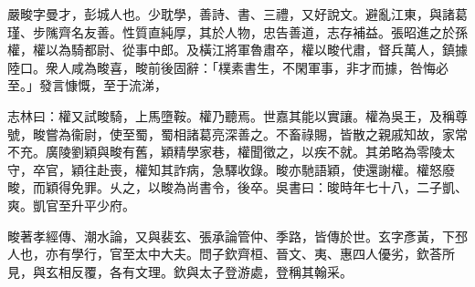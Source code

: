 
\begin{pinyinscope}
嚴畯字曼才，彭城人也。少耽學，善詩、書、三禮，又好說文。避亂江東，與諸葛瑾、步隲齊名友善。性質直純厚，其於人物，忠告善道，志存補益。張昭進之於孫權，權以為騎都尉、從事中郎。及橫江將軍魯肅卒，權以畯代肅，督兵萬人，鎮據陸口。衆人咸為畯喜，畯前後固辭：「樸素書生，不閑軍事，非才而據，咎悔必至。」發言慷慨，至于流涕，

志林曰：權又試畯騎，上馬墮鞍。權乃聽焉。世嘉其能以實讓。權為吳王，及稱尊號，畯嘗為衞尉，使至蜀，蜀相諸葛亮深善之。不畜祿賜，皆散之親戚知故，家常不充。廣陵劉穎與畯有舊，穎精學家巷，權聞徵之，以疾不就。其弟略為零陵太守，卒官，穎往赴喪，權知其詐病，急驛收錄。畯亦馳語穎，使還謝權。權怒廢畯，而穎得免罪。乆之，以畯為尚書令，後卒。吳書曰：晙時年七十八，二子凱、爽。凱官至升平少府。

畯著孝經傳、潮水論，又與裴玄、張承論管仲、季路，皆傳於世。玄字彥黃，下邳人也，亦有學行，官至太中大夫。問子欽齊桓、晉文、夷、惠四人優劣，欽荅所見，與玄相反覆，各有文理。欽與太子登游處，登稱其翰采。


\end{pinyinscope}